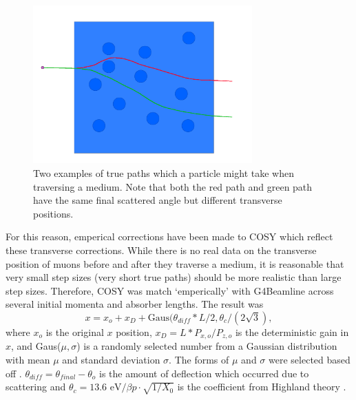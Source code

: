 \begin{figure}
  \centering
    \includegraphics[width=0.75\textwidth]{Figures/lateral_displacement} 
  \caption{Two examples of true paths which a particle might take when traversing a medium. Note that both the red path and green path have the same final scattered angle but different transverse positions.}
  \label{fig:lateral_displacement}
\end{figure}

For this reason, emperical corrections have been made to COSY which reflect these transverse corrections. While there is no real data on the transverse position of muons before and after they traverse a medium, it is reasonable that very small step sizes (very short true paths) should be more realistic than large step sizes. Therefore, COSY was match `emperically' with G4Beamline across several initial momenta and absorber lengths. The result was
\begin{equation}\label{eqn:cosylatdis}
x = x_o + x_D+\text{Gaus}(\theta_{diff} *L/2,\theta_c /(2\sqrt{3}),
\end{equation}
where $x_o$ is the original $x$ position, $x_D = L*P_{x,o}/P_{z,o}$ is the deterministic  gain in $x$, and Gaus($\mu,\sigma$) is a randomly selected number from a Gaussian distribution with mean $\mu$ and standard deviation $\sigma$. The forms of $\mu$ and $\sigma$ were selected based off \cite{fernowAndGallardo}. $\theta_{diff}=\theta_{final}-\theta_o$ is the amount of deflection which occurred due to scattering and $\theta_c=13.6 \text{ eV}/\beta p \cdot \sqrt{1/X_0}$ is the coefficient from Highland theory \cite{highland}.

